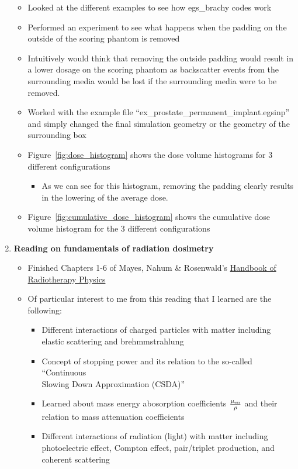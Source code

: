 \documentclass[12pt]{article}
\begin{document}
\begin{enumerate}
	\begin{itemize}
		\item Looked at the different examples to see how egs\_brachy codes work 
		\item Performed an experiment to see what happens when the padding on the outside of the scoring phantom is removed
		\item Intuitively would think that removing the outside padding would result in a lower dosage on the scoring phantom as backscatter events from the surrounding media would be lost if the surrounding media were to be removed.
		\item Worked with the example file ``ex\_prostate\_permanent\_implant.egsinp'' and simply changed the final simulation geometry or the geometry of the surrounding box
		\item Figure~\ref{fig:dose_histogram} shows the dose volume histograms for 3 different configurations
		\begin{itemize}
			\item As we can see for this histogram, removing the padding clearly results in the lowering of the average dose. 
		\end{itemize}
		\item Figure~\ref{fig:cumulative_dose_histogram} shows the cumulative dose volume histogram for the 3 different configurations
	\end{itemize}
	\item \textbf{Reading on fundamentals of radiation dosimetry}
	\begin{itemize}
		\item Finished Chapters 1-6 of Mayes, Nahum \& Rosenwald's \underline{Handbook of Radiotherapy Physics}
		\item Of particular interest to me from this reading that I learned are the following:
		\begin{itemize}
			\item Different interactions of charged particles with matter including elastic scattering and brehmmstrahlung
			\item Concept of stopping power and its relation to the so-called ``Continuous \\ Slowing Down Approximation (CSDA)''
			\item Learned about mass energy abosorption coefficients $ \frac{\mu_{\rm en}}{\rho} $ and their relation to mass attenuation coefficients
			\item Different interactions of radiation (light) with matter including photoelectric effect, Compton effect, pair/triplet production, and coherent scattering

\end{itemize}
\end{itemize}
\end{enumerate}
\end{document}
